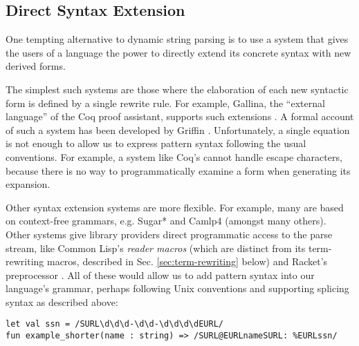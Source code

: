 \subsection{Direct Syntax Extension}\label{sec:direct-syntax-extension}
One tempting alternative to dynamic string parsing is to use a system that gives the users of a language the power to directly extend its concrete syntax with new derived forms. %

The simplest such systems are those where the elaboration of each new syntactic form is defined by a single rewrite rule. For example, Gallina, the ``external language'' of the Coq proof assistant, supports such extensions \cite{Coq:manual}. A formal account of such a system has been developed by Griffin \cite{5134}. Unfortunately, a single equation is not enough to allow us to express pattern syntax following the usual conventions. For example, a system like Coq's cannot handle escape characters, because there is no way to programmatically examine a form when generating its expansion.

Other syntax extension systems are more flexible. For example, many are based on context-free grammars, e.g.  Sugar* \cite{erdweg2013framework} and Camlp4 \cite{ocaml-manual} (amongst many others). Other systems give library providers direct programmatic access to the parse stream, like Common Lisp's \emph{reader macros} \cite{steele1990common} (which are distinct from its term-rewriting macros, described in Sec. \ref{sec:term-rewriting} below) and Racket's preprocessor \cite{Flatt:2012:CLR:2063176.2063195}. All of these would allow us to add pattern syntax into our language's grammar, perhaps following Unix conventions and supporting splicing syntax as described above:
\begin{lstlisting}[numbers=none]
let val ssn = /SURL\d\d\d-\d\d-\d\d\d\dEURL/
fun example_shorter(name : string) => /SURL@EURLnameSURL: %EURLssn/
\end{lstlisting}

